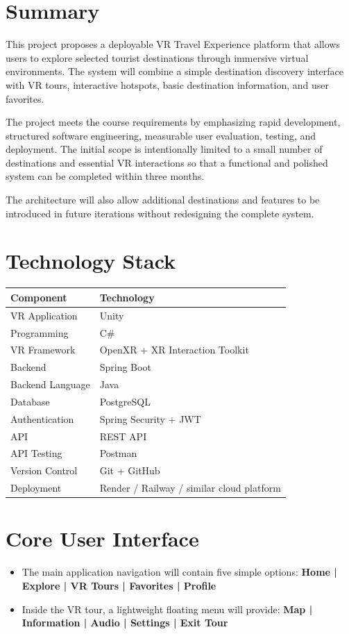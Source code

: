 \documentclass[11pt,a4paper]{article}
\begin{document}
\section{Summary}

This project proposes a deployable VR Travel Experience platform that allows users to explore
selected tourist destinations through immersive virtual environments. The system will combine a
simple destination discovery interface with VR tours, interactive hotspots, basic destination
information, and user favorites.

The project meets the course requirements by emphasizing rapid development, structured software
engineering, measurable user evaluation, testing, and deployment. The initial scope is intentionally
limited to a small number of destinations and essential VR interactions so that a functional and
polished system can be completed within three months.

The architecture will also allow additional destinations and features to be introduced in future
iterations without redesigning the complete system.

\section*{Technology Stack}

\begin{center}
\begin{tabular}{p{} p{}}
\textbf{Component} & \textbf{Technology} \\ \hline
VR Application & Unity \\
Programming & C\# \\
VR Framework & OpenXR + XR Interaction Toolkit \\
Backend & Spring Boot \\
Backend Language & Java \\
Database & PostgreSQL \\
Authentication & Spring Security + JWT \\
API & REST API \\
API Testing & Postman \\
Version Control & Git + GitHub \\
Deployment & Render / Railway / similar cloud platform
\end{tabular}
\end{center}

\section*{Core User Interface}

\begin{itemize}[leftmargin=0.7cm]
    \item The main application navigation will contain five simple options:
    \textbf{Home | Explore | VR Tours | Favorites | Profile}
    \item Inside the VR tour, a lightweight floating menu will provide:
    \textbf{Map | Information | Audio | Settings | Exit Tour}
\end{itemize}
\end{document}
